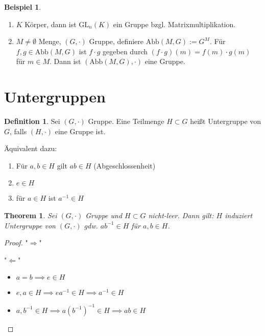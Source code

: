 \documentclass[fleqn, 12pt]{scrartcl}
\newtheorem{thm}{Theorem}
\theoremstyle{definition}
\newtheorem*{defn}{Definition}
\newtheorem{ex}{Beispiel}
\theoremstyle{remark}
\newcommand{\gl}{\text{GL}}
\newcommand{\abb}{\text{Abb}}
\newcommand{\inv}[1]{\left(#1\right)^{-1}}
\newcommand{\Inv}[1]{#1^{-1}}
\begin{document}
\begin{ex}
    \begin{enumerate}
        \item \(K\) Körper, dann ist \(\gl_n(K)\) ein Gruppe bzgl. Matrixmultiplikation.
        \item \(M\neq \emptyset\) Menge, \((G, \cdot)\) Gruppe, definiere \(\abb(M,G):=G^M\). Für \(f,g\in \abb(M,G)\) ist \(f\cdot g\) gegeben durch \((f\cdot g)(m)=f(m)\cdot g(m)\) für \(m\in M\). Dann ist \((\abb(M,G), \cdot)\) eine Gruppe.
    \end{enumerate}
\end{ex}

\section{Untergruppen}

\begin{defn}
    Sei \((G, \cdot)\) Gruppe. Eine Teilmenge \(H\subset G\) heißt Untergruppe von \(G\), falls \((H, \cdot)\) eine Gruppe ist.

    Äquivalent dazu:

    \begin{enumerate}
        \item Für \(a,b\in H\) gilt \(ab\in H\) (Abgeschlossenheit)
        \item \(e\in H\)
        \item für \(a\in H\) ist \(\Inv a \in H\)
    \end{enumerate}
\end{defn}

\begin{thm}
    Sei \((G, \cdot)\) Gruppe und \(H\subset G\) nicht-leer. Dann gilt: \(H\) induziert Untergruppe von \((G, \cdot)\) gdw. \(a\Inv b\in H\) für \(a,b\in H\).
\end{thm}

\begin{proof}
    "\(\Rightarrow\)" \checkmark

    "\(\Leftarrow\)" 

    \begin{itemize} 
        \item \(a=b \implies e\in H\)
        \item \(e,a\in H \implies e\Inv a\in H \implies \Inv a \in H\)
        \item \(a,\Inv b\in H \implies a\inv{\Inv b} \in H \implies ab\in H\)
    \end{itemize}
\end{proof}
\end{document}
